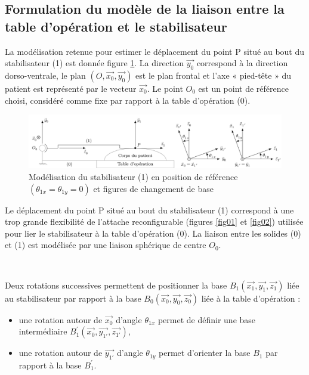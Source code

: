 \subsection{Formulation du modèle de la liaison entre la table d'opération et le stabilisateur\label{partII2}}

La modélisation retenue pour estimer le déplacement du point P situé au bout du stabilisateur (1) est donnée figure \ref{fig05}. La direction $\overrightarrow{y_0}$ correspond à la direction dorso-ventrale, le plan $(O,\overrightarrow{x_0},\overrightarrow{y_0})$ est le plan frontal et l'axe « pied-tête » du patient est représenté par le vecteur $\overrightarrow{x_0}$. Le point $O_0$ est un point de référence choisi, considéré comme fixe par rapport à la table d'opération (0). 

\begin{figure}[ht]
\begin{center}
\includegraphics[width=0.95\linewidth]{img/fig05}
\caption{Modélisation du stabilisateur (1) en position de référence $(\theta_{1x}=\theta_{1y}=0)$ et figures de changement de base }
\label{fig05}
\end{center}
\end{figure}

Le déplacement du point P situé au bout du stabilisateur (1) correspond à une trop grande flexibilité de l'attache reconfigurable (figures \ref{fig01} et \ref{fig02}) utilisée pour lier le stabilisateur à la table d'opération (0). La liaison entre les solides (0) et (1) est modélisée par une liaison sphérique de centre $O_0$.

~\

Deux rotations successives permettent de positionner la base $B_1 (\overrightarrow{x_1},\overrightarrow{y_1},\overrightarrow{z_1})$ liée au stabilisateur par rapport à la base $B_0(\overrightarrow{x_0},\overrightarrow{y_0},\overrightarrow{z_0})$ liée à la table d'opération :
\begin{itemize}
 \item une rotation autour de $\overrightarrow{x_0}$ d'angle $\theta_{1x}$ permet de définir une base intermédiaire $B_1^{'}(\overrightarrow{x_0},\overrightarrow{y_{1'}},\overrightarrow{z_{1'}})$,
 \item une rotation autour de $\overrightarrow{y_{1'}}$  d'angle $\theta_{1y}$ permet d'orienter la base $B_1$ par rapport à la base $B_1^{'}$. 
\end{itemize}

